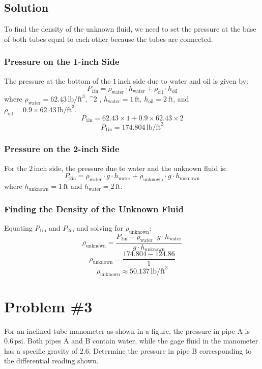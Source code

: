 \documentclass[12pt]{article}
\begin{document}
\subsection*{Solution}
To find the density of the unknown fluid, we need to set the pressure at the base of both tubes equal to each other because the tubes are connected.

\subsubsection*{Pressure on the 1-inch Side}
The pressure at the bottom of the \(1 \, \text{inch}\) side due to water and oil is given by:
\[
P_{1\text{in}} = \rho_{\text{water}} \cdot h_{\text{water}} + \rho_{\text{oil}} \cdot h_{\text{oil}}
\]
where \(\rho_{\text{water}} = 62.43 \, \text{lb/ft}^3\), ^2\) , \(h_{\text{water}} = 1 \, \text{ft}\), \(h_{\text{oil}} = 2 \, \text{ft}\), and \(\rho_{\text{oil}} = 0.9 \times 62.43 \, \text{lb/ft}^3\).
\[
P_{1\text{in}} = 62.43 \times 1 + 0.9 \times 62.43 \times 2
\]
\[
P_{1\text{in}} = 174.804 \, \text{lb/ft}^2
\]

\subsubsection*{Pressure on the 2-inch Side}
For the \(2 \, \text{inch}\) side, the pressure due to water and the unknown fluid is:
\[
P_{2\text{in}} = \rho_{\text{water}} \cdot g \cdot h_{\text{water}} + \rho_{\text{unknown}} \cdot g \cdot h_{\text{unknown}}
\]
where \(h_{\text{unknown}} = 1 \, \text{ft}\) and \(h_{\text{water}} = 2 \, \text{ft}\).

\subsubsection*{Finding the Density of the Unknown Fluid}
Equating \(P_{1\text{in}}\) and \(P_{2\text{in}}\) and solving for \(\rho_{\text{unknown}}\):
\[
\rho_{\text{unknown}} = \frac{P_{1\text{in}} - \rho_{\text{water}} \cdot g \cdot h_{\text{water}}}{g \cdot h_{\text{unknown}}}
\]
\[
\rho_{\text{unknown}} = \frac{174.804 - 124.86}{1}
\]
\[
\rho_{\text{unknown}} \approx 50.137 \, \text{lb/ft}^3
\]

\newpage
\section*{Problem \#3}
For an inclined-tube manometer as shown in a figure, the pressure in pipe A is \(0.6 \, \text{psi}\). Both pipes A and B contain water, while the gage fluid in the manometer has a specific gravity of \(2.6\). Determine the pressure in pipe B corresponding to the differential reading shown.
\end{document}
